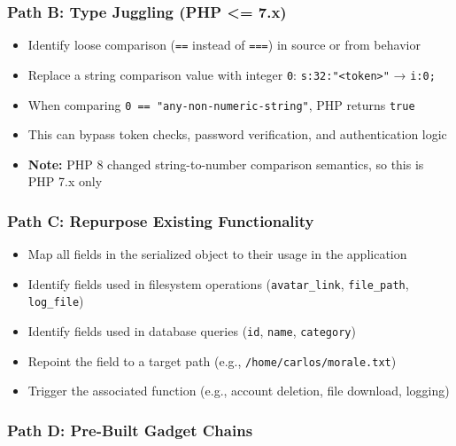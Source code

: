 \documentclass[11pt]{article}
\begin{document}
\subsubsection{Path B: Type Juggling (PHP <= 7.x)}
\begin{checklistbox}
\begin{itemize}
    \item[\checkmark] Identify loose comparison (\texttt{==} instead of \texttt{===}) in source or from behavior
    \item[\checkmark] Replace a string comparison value with integer \texttt{0}: \texttt{s:32:"<token>"} → \texttt{i:0;}
    \item[\checkmark] When comparing \texttt{0 == "any-non-numeric-string"}, PHP returns \texttt{true}
    \item[\checkmark] This can bypass token checks, password verification, and authentication logic
    \item[\checkmark] \textbf{Note:} PHP 8 changed string-to-number comparison semantics, so this is PHP 7.x only
\end{itemize}
\end{checklistbox}

\subsubsection{Path C: Repurpose Existing Functionality}
\begin{checklistbox}
\begin{itemize}
    \item[\checkmark] Map all fields in the serialized object to their usage in the application
    \item[\checkmark] Identify fields used in filesystem operations (\texttt{avatar\_link}, \texttt{file\_path}, \texttt{log\_file})
    \item[\checkmark] Identify fields used in database queries (\texttt{id}, \texttt{name}, \texttt{category})
    \item[\checkmark] Repoint the field to a target path (e.g., \texttt{/home/carlos/morale.txt})
    \item[\checkmark] Trigger the associated function (e.g., account deletion, file download, logging)
\end{itemize}
\end{checklistbox}

\subsubsection{Path D: Pre-Built Gadget Chains}
\end{document}
